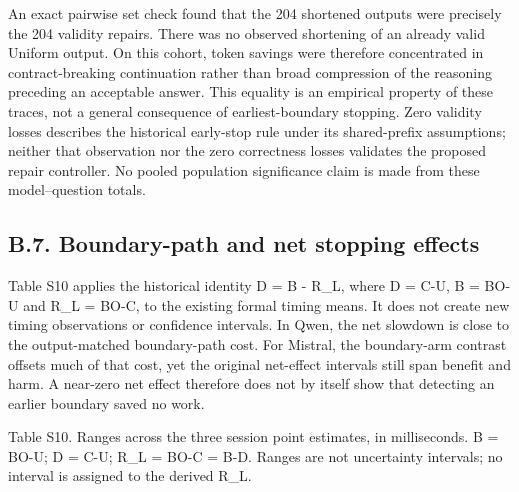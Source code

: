 \documentclass[
  12pt,
  a4paper,
]{article}
\begin{document}
An exact pairwise set check found that the 204 shortened outputs were
precisely the 204 validity repairs. There was no observed shortening of
an already valid Uniform output. On this cohort, token savings were
therefore concentrated in contract-breaking continuation rather than
broad compression of the reasoning preceding an acceptable answer. This
equality is an empirical property of these traces, not a general
consequence of earliest-boundary stopping. Zero validity losses
describes the historical early-stop rule under its shared-prefix
assumptions; neither that observation nor the zero correctness losses
validates the proposed repair controller. No pooled population
significance claim is made from these model--question totals.

\subsection{B.7. Boundary-path and net stopping
effects}\label{b.7.-boundary-path-and-net-stopping-effects}

Table S10 applies the historical identity D = B - R\_L, where D = C-U, B
= BO-U and R\_L = BO-C, to the existing formal timing means. It does not
create new timing observations or confidence intervals. In Qwen, the net
slowdown is close to the output-matched boundary-path cost. For Mistral,
the boundary-arm contrast offsets much of that cost, yet the original
net-effect intervals still span benefit and harm. A near-zero net effect
therefore does not by itself show that detecting an earlier boundary
saved no work.

Table S10. Ranges across the three session point estimates, in
milliseconds. B = BO-U; D = C-U; R\_L = BO-C = B-D. Ranges are not
uncertainty intervals; no interval is assigned to the derived R\_L.
\end{document}
